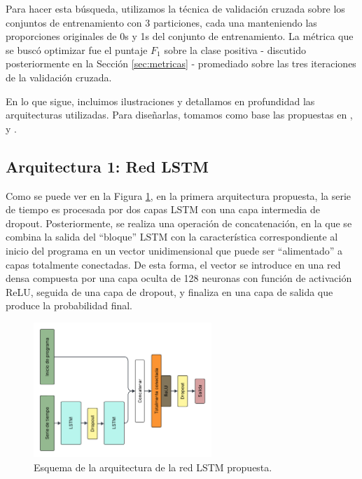 \documentclass[../../main.tex]{subfiles}
\begin{document}
Para hacer esta búsqueda, utilizamos la técnica de validación cruzada sobre los conjuntos
de entrenamiento con 3 particiones, cada una manteniendo las proporciones originales de 0s
y 1s del conjunto de entrenamiento. La métrica que se buscó optimizar fue el puntaje
\(F_1\) sobre la clase positiva - discutido posteriormente en la Sección
\ref{sec:metricas} - promediado sobre las tres iteraciones de la validación cruzada.

En lo que sigue, incluimos ilustraciones y detallamos en profundidad las arquitecturas
utilizadas. Para diseñarlas, tomamos como base las propuestas en
\cite{wang2016timeseriesclassificationscratch}, \cite{Karim_2018} y
\cite{timeseriesclass-with-rnn}.

\subsection{Arquitectura 1: Red LSTM}
Como se puede ver en la Figura \ref{fig:lstm_v2}, en la primera arquitectura propuesta, la
serie de tiempo es procesada por dos capas LSTM con una capa intermedia de dropout.
Posteriormente, se realiza una operación de concatenación, en la que se combina la salida
del ``bloque'' LSTM con la característica correspondiente al inicio del programa en un
vector unidimensional que puede ser ``alimentado'' a capas totalmente conectadas. De esta
forma, el vector se introduce en una red densa compuesta por una capa oculta de 128
neuronas con función de activación ReLU, seguida de una capa de dropout, y finaliza en una
capa de salida que produce la probabilidad final.
\begin{figure}[ht]
    \centering
    \includegraphics[width=0.6\textwidth]{figs/lstm_v2.png}
    \caption{Esquema de la arquitectura de la red LSTM propuesta.}
    \label{fig:lstm_v2}
\end{figure}
\end{document}
